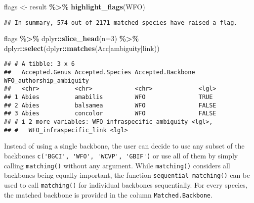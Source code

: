 \documentclass[
  11pt,
]{article}
\newenvironment{Shaded}{\begin{snugshade}}{\end{snugshade}}
\newcommand{\AttributeTok}[1]{\textcolor[rgb]{0.13,0.29,0.53}{#1}}
\newcommand{\DecValTok}[1]{\textcolor[rgb]{0.00,0.00,0.81}{#1}}
\newcommand{\FunctionTok}[1]{\textcolor[rgb]{0.13,0.29,0.53}{\textbf{#1}}}
\newcommand{\NormalTok}[1]{#1}
\newcommand{\OtherTok}[1]{\textcolor[rgb]{0.56,0.35,0.01}{#1}}
\newcommand{\SpecialCharTok}[1]{\textcolor[rgb]{0.81,0.36,0.00}{\textbf{#1}}}
\newcommand{\StringTok}[1]{\textcolor[rgb]{0.31,0.60,0.02}{#1}}
\begin{document}
\begin{Shaded}
\begin{Highlighting}[]
\NormalTok{flags }\OtherTok{\textless{}{-}}\NormalTok{ result }\SpecialCharTok{\%\textgreater{}\%} \FunctionTok{highlight\_flags}\NormalTok{(}\StringTok{\textquotesingle{}WFO\textquotesingle{}}\NormalTok{)}
\end{Highlighting}
\end{Shaded}

\begin{verbatim}
## In summary, 574 out of 2171 matched species have raised a flag.
\end{verbatim}

\begin{Shaded}
\begin{Highlighting}[]
\NormalTok{flags }\SpecialCharTok{\%\textgreater{}\%} 
\NormalTok{  dplyr}\SpecialCharTok{::}\FunctionTok{slice\_head}\NormalTok{(}\AttributeTok{n=}\DecValTok{3}\NormalTok{) }\SpecialCharTok{\%\textgreater{}\%} 
\NormalTok{  dplyr}\SpecialCharTok{::}\FunctionTok{select}\NormalTok{(dplyr}\SpecialCharTok{::}\FunctionTok{matches}\NormalTok{(}\StringTok{\textquotesingle{}Acc|ambiguity|link\textquotesingle{}}\NormalTok{))}
\end{Highlighting}
\end{Shaded}

\begin{verbatim}
## # A tibble: 3 x 6
##   Accepted.Genus Accepted.Species Accepted.Backbone WFO_authorship_ambiguity
##   <chr>          <chr>            <chr>             <lgl>                   
## 1 Abies          amabilis         WFO               TRUE                    
## 2 Abies          balsamea         WFO               FALSE                   
## 3 Abies          concolor         WFO               FALSE                   
## # i 2 more variables: WFO_infraspecific_ambiguity <lgl>,
## #   WFO_infraspecific_link <lgl>
\end{verbatim}

\noindent Instead of using a single backbone, the user can decide to use
any subset of the backbones \verb|c('BGCI', 'WFO', 'WCVP', 'GBIF')| or
use all of them by simply calling \verb|matching()| without any
argument. While \verb|matching()| considers all backbones being equally
important, the function \verb|sequential_matching()| can be used to call
\verb|matching()| for individual backbones sequentially. For every
species, the matched backbone is provided in the column
\verb|Matched.Backbone|.
\end{document}
